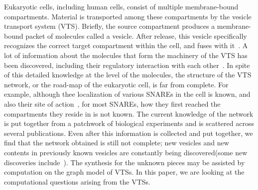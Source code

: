 
Eukaryotic cells, including human cells, consist of multiple membrane-bound compartments.
%
Material is transported among these compartments by the vesicle
transport system (VTS).
%
Briefly, the source compartment produces a membrane-bound packet of
molecules called a vesicle.
%
After release, this vesicle specifically recognizes the correct target
compartment within the cell, and fuses with it~\cite{alberts2013essential}.
%
A lot of information about the molecules that form the machinery of
the VTS has been discovered, including their regulatory interaction
with each other~\cite{bonifacino2004mechanisms}. 
%
In spite of this detailed knowledge at the level of the molecules, the
structure of the VTS network, or the road-map of the eukaryotic cell,
is far from complete.
%
For example, although thee localization of various SNAREs in the cell is known, and also their site of action~\cite{hong2014tethering}, for most SNAREs, how they first reached the compartments they reside in is not known.
%
The current knowledge of the network is put together from a patchwork
of biological experiments and is scattered across several publications.
%
Even after this information is collected and put together, we find
that the network obtained is still not complete; new vesicles and new
contents in previously known vesicles are constantly being discovered(some new discoveries include~\cite{chanaday2017you, d2017tethering, rodepeter2017indication, zhao2017conserved}).
%
The synthesis for the unknown pieces may be assisted by computation on
the graph model of VTSs.
%
% 
%
%
%
%
%
In this paper, we are looking at the computational questions 
arising from the VTSs.


